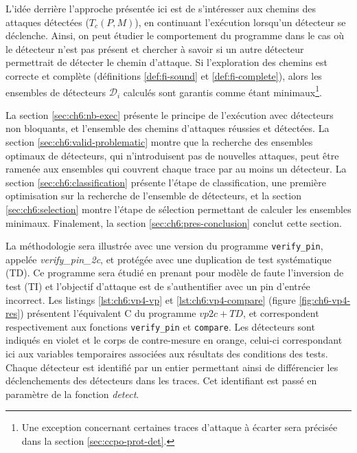         L'idée derrière l'approche présentée ici est de s'intéresser aux chemins des attaques détectées ($T_c(P, M)$), en continuant l'exécution lorsqu'un détecteur se déclenche.
        Ainsi, on peut étudier le comportement du programme dans le cas où le détecteur n'est pas présent et chercher à savoir si un autre détecteur permettrait de détecter le chemin d'attaque. Si l'exploration des chemins est correcte et complète (définitions \ref{def:fi-sound} et \ref{def:fi-complete}), alors les ensembles de détecteurs $\mathcal{D}_i$ calculés sont garantis comme étant minimaux\footnote{Une exception concernant certaines traces d'attaque à écarter sera précisée dans la section \ref{sec:ccpo-prot-det}.}.
        
        La section \ref{sec:ch6:nb-exec} présente le principe de l'exécution avec détecteurs non bloquants, et l'ensemble des chemins d'attaques réussies et détectées.
        La section \ref{sec:ch6:valid-problematic} montre que la recherche des ensembles optimaux de détecteurs, qui n'introduisent pas de nouvelles attaques, peut être ramenée aux ensembles qui couvrent chaque trace par au moins un détecteur.
        La section \ref{sec:ch6:classification} présente l'étape de classification, une première optimisation sur la recherche de l'ensemble de détecteurs, et la section \ref{sec:ch6:selection} montre l'étape de sélection permettant de calculer les ensembles minimaux.
        Finalement, la section \ref{sec:ch6:pres-conclusion} conclut cette section.

        La méthodologie sera illustrée avec une version du programme \texttt{verify\_pin}, appelée \textit{verify\_pin\_2c}, et protégée avec une duplication de test systématique (\gls{TD}).
        Ce programme sera étudié en prenant pour modèle de faute l'inversion de test (\gls{TI}) et l'objectif d'attaque est de s'authentifier avec un \gls{pin} d'entrée incorrect.
        Les listings \ref{lst:ch6:vp4-vp} et \ref{lst:ch6:vp4-compare} (figure \ref{fig:ch6-vp4-res}) présentent l'équivalent C du programme $vp2c+TD$, et correspondent respectivement aux fonctions \texttt{verify\_pin} et \texttt{compare}. 
        Les détecteurs sont indiqués en violet et le corps de contre-mesure en orange, celui-ci correspondant ici aux variables temporaires associées aux résultats des conditions des tests.
        Chaque détecteur est identifié par un entier permettant ainsi de différencier les déclenchements des détecteurs dans les traces. Cet identifiant est passé en paramètre de la fonction \textit{detect}.

